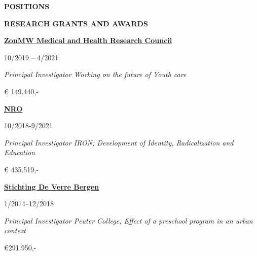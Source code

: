 \documentclass[
  16,
]{article}
\begin{document}
\begin{large}{\bf POSITIONS}
\begin{large}{\bf RESEARCH GRANTS AND AWARDS}
\begin{multicols}{2}
    \begin{flushleft}{\bf \href{https://www.zonmw.nl/nl/}{ZonMW Medical and Health Research Council}}\end{flushleft}
    \begin{flushright}10/2019 – 4/2021\end{flushright}
  \end{multicols}
  \vspace{-0.17cm}
  \begin{multicols}{2}
    \begin{flushleft}\textit{Principal Investigator Working on the future of Youth care}\end
    {flushleft}\begin{flushright}€ 149.440,- \end
    {flushright}
  \end{multicols}

\vspace{7pt}


\begin{multicols}{2}
    \begin{flushleft}{\bf \href{https://www.nro.nl/}{NRO}}\end{flushleft}
    \begin{flushright}10/2018-9/2021\end{flushright}
  \end{multicols}
  \vspace{-0.17cm}
  \begin{multicols}{2}
    \begin{flushleft}\textit{Principal Investigator IRON; Development of Identity, Radicalization and Education}\end
    {flushleft}
    \begin{flushright}€ 435.519,-  \end
    {flushright}
  \end{multicols}

\vspace{7pt}


\begin{multicols}{2}
    \begin{flushleft}{\bf \href{https://www.deverrebergen.nl/}{Stichting De Verre Bergen}}\end{flushleft}
    \begin{flushright}1/2014–12/2018\end{flushright}
  \end{multicols}
  \vspace{-0.17cm}
  \begin{multicols}{2}
    \begin{flushleft}\textit{Principal Investigator Peuter College, Effect of a preschool program in an urban context}\end
    {flushleft}
    \begin{flushright}€291.950,-  \end
    {flushright}
  \end{multicols}


\end{large}
\end{large}
\end{document}
